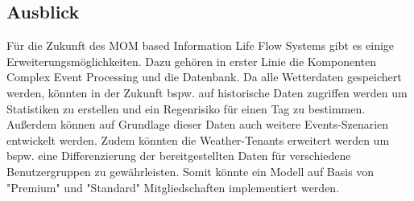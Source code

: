 \subsection{Ausblick}

Für die Zukunft des MOM based Information Life Flow Systems gibt es einige Erweiterungsmöglichkeiten. Dazu gehören in erster Linie die Komponenten Complex Event Processing und die Datenbank. Da alle Wetterdaten gespeichert werden, könnten in der Zukunft bspw. auf historische Daten zugriffen werden um Statistiken zu erstellen und ein Regenrisiko für einen Tag zu bestimmen. Außerdem können auf Grundlage dieser Daten auch weitere Events-Szenarien entwickelt werden. Zudem könnten die Weather-Tenants erweitert werden um bspw. eine Differenzierung der bereitgestellten Daten für verschiedene Benutzergruppen zu gewährleisten. Somit könnte ein Modell auf Basis von "Premium" und "Standard" Mitgliedschaften implementiert werden.
